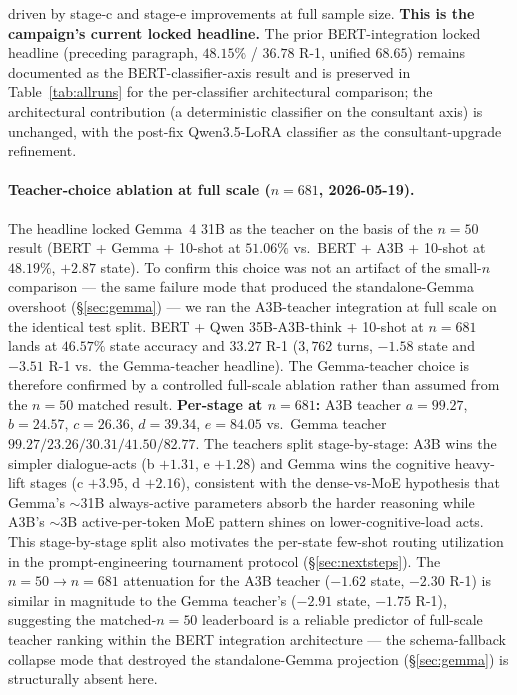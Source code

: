 \documentclass[11pt]{article}
\begin{document}
driven by stage-c and stage-e improvements at full sample size. \textbf{This is the campaign's current locked headline.} The prior BERT-integration locked headline (preceding paragraph, $48.15\%$ / $36.78$ R-1, unified $68.65$) remains documented as the BERT-classifier-axis result and is preserved in Table~\ref{tab:allruns} for the per-classifier architectural comparison; the architectural contribution (a deterministic classifier on the consultant axis) is unchanged, with the post-fix Qwen3.5-LoRA classifier as the consultant-upgrade refinement.

\paragraph{Teacher-choice ablation at full scale ($n{=}681$, 2026-05-19).} The headline locked Gemma~4 31B as the teacher on the basis of the $n{=}50$ result (BERT + Gemma + 10-shot at $51.06\%$ vs.\ BERT + A3B + 10-shot at $48.19\%$, $+2.87$ state). To confirm this choice was not an artifact of the small-$n$ comparison --- the same failure mode that produced the standalone-Gemma overshoot (\S\ref{sec:gemma}) --- we ran the A3B-teacher integration at full scale on the identical test split. BERT + Qwen 35B-A3B-think + 10-shot at $n{=}681$ lands at $\mathbf{46.57\%}$ state accuracy and $\mathbf{33.27}$ R-1 ($3{,}762$ turns, $-1.58$ state and $-3.51$ R-1 vs.\ the Gemma-teacher headline). The Gemma-teacher choice is therefore confirmed by a controlled full-scale ablation rather than assumed from the $n{=}50$ matched result. \textbf{Per-stage at $n{=}681$:} A3B teacher $a{=}99.27$, $b{=}24.57$, $c{=}26.36$, $d{=}39.34$, $e{=}84.05$ vs.\ Gemma teacher $99.27 / 23.26 / 30.31 / 41.50 / 82.77$. The teachers split stage-by-stage: A3B wins the simpler dialogue-acts (b $+1.31$, e $+1.28$) and Gemma wins the cognitive heavy-lift stages (c $+3.95$, d $+2.16$), consistent with the dense-vs-MoE hypothesis that Gemma's $\sim$31B always-active parameters absorb the harder reasoning while A3B's $\sim$3B active-per-token MoE pattern shines on lower-cognitive-load acts. This stage-by-stage split also motivates the per-state few-shot routing utilization in the prompt-engineering tournament protocol (\S\ref{sec:nextsteps}). The $n{=}50 \to n{=}681$ attenuation for the A3B teacher ($-1.62$ state, $-2.30$ R-1) is similar in magnitude to the Gemma teacher's ($-2.91$ state, $-1.75$ R-1), suggesting the matched-$n{=}50$ leaderboard is a reliable predictor of full-scale teacher ranking within the BERT integration architecture --- the schema-fallback collapse mode that destroyed the standalone-Gemma projection (\S\ref{sec:gemma}) is structurally absent here.
\end{document}
